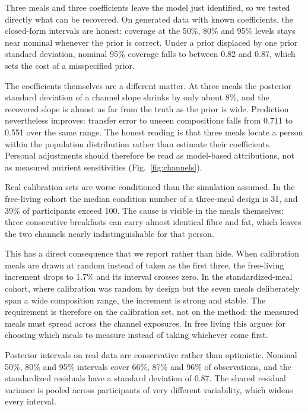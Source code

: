 \documentclass[pdflatex,sn-nature]{sn-jnl}
\theoremstyle{thmstyleone}
\theoremstyle{thmstyletwo}
\theoremstyle{thmstylethree}
\begin{document}
Three meals and three coefficients leave the model just identified, so we tested directly what can be recovered. On generated data with known coefficients, the closed-form intervals are honest: coverage at the 50\%, 80\% and 95\% levels stays near nominal whenever the prior is correct. Under a prior displaced by one prior standard deviation, nominal 95\% coverage falls to between 0.82 and 0.87, which sets the cost of a misspecified prior.

The coefficients themselves are a different matter. At three meals the posterior standard deviation of a channel slope shrinks by only about 8\%, and the recovered slope is almost as far from the truth as the prior is wide. Prediction nevertheless improves: transfer error to unseen compositions falls from 0.711 to 0.551 over the same range. The honest reading is that three meals locate a person within the population distribution rather than estimate their coefficients. Personal adjustments should therefore be read as model-based attributions, not as measured nutrient sensitivities (Fig.~\ref{fig:channels}).

Real calibration sets are worse conditioned than the simulation assumed. In the free-living cohort the median condition number of a three-meal design is 31, and 39\% of participants exceed 100. The cause is visible in the meals themselves: three consecutive breakfasts can carry almost identical fibre and fat, which leaves the two channels nearly indistinguishable for that person.

This has a direct consequence that we report rather than hide. When calibration meals are drawn at random instead of taken as the first three, the free-living increment drops to 1.7\% and its interval crosses zero. In the standardized-meal cohort, where calibration was random by design but the seven meals deliberately span a wide composition range, the increment is strong and stable. The requirement is therefore on the calibration set, not on the method: the measured meals must spread across the channel exposures. In free living this argues for choosing which meals to measure instead of taking whichever come first.

Posterior intervals on real data are conservative rather than optimistic. Nominal 50\%, 80\% and 95\% intervals cover 66\%, 87\% and 96\% of observations, and the standardized residuals have a standard deviation of 0.87. The shared residual variance is pooled across participants of very different variability, which widens every interval.
\end{document}

